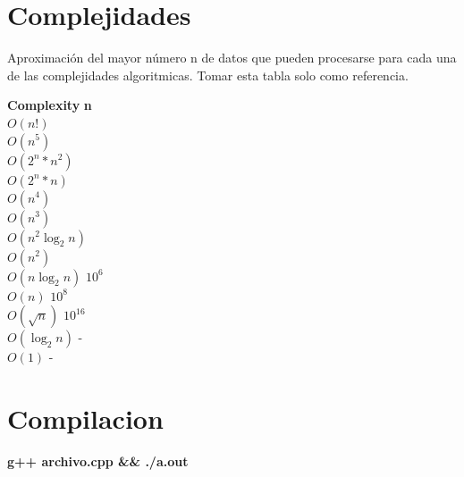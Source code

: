 \section{Complejidades}
Aproximación del mayor número n de datos que pueden procesarse para cada una de las complejidades algoritmicas. Tomar esta tabla solo como referencia.

\begin{tabbing}
\textbf{Complexity}\hspace{4cm} \=  \textbf{n}\hspace{3cm}   \\ 
$O(n!)$ \\ 
$O(n^{5})$ \\ 
$O(2^{n}*n^{2})$ \\ 
$O(2^{n}*n)$ \\ 
$O(n^{4})$ \\ 
$O(n^{3})$ \\ 
$O(n^{2}\log_{2}n)$ \\ 
$O(n^{2})$ \\ 
$O(n\log_{2}n)$ \> $10^{6}$\\ 
$O(n)$ \> $10^{8}$\\ 
$O(\sqrt{n})$ \> $10^{16}$\\ 
$O(\log_{2}n)$ \> -\\ 
$O(1)$ \> -\\ 
\end{tabbing}

\section{Compilacion}
\textbf{g++ archivo.cpp \&\& ./a.out}



